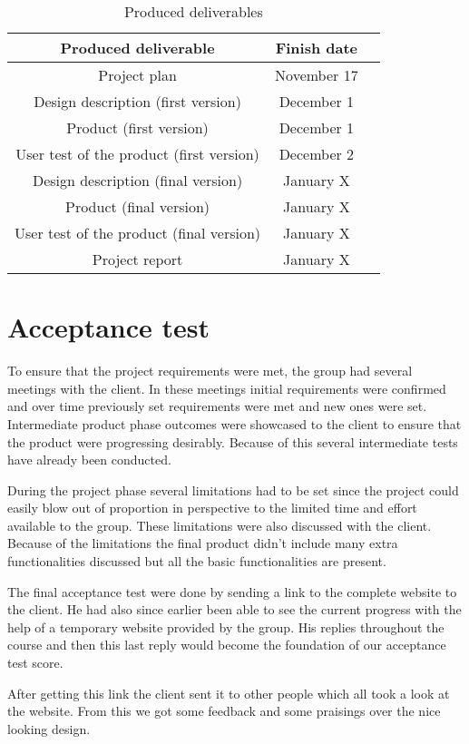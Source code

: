 \documentclass[]{article}
\begin{document}
\begin{table}[h!]
	\centering
	\label{tab:table1}
	\begin{tabular}{ccc}
		\toprule
		Produced deliverable & Finish date\\
		\midrule
		Project plan & November 17 \\
		Design description (first version) & December 1 \\
		Product (first version) & December 1 \\
		User test of the product (first version) & December 2 \\
		Design description (final version) & January X \\
		Product (final version) & January X \\
		User test of the product (final version) & January X \\
		Project report & January X \\
		\bottomrule
	\end{tabular}
	\caption{Produced deliverables}
\end{table}

\section{Acceptance test}
To ensure that the project requirements were met, the group had several meetings with the client. In these meetings initial requirements were confirmed and over time previously set requirements were met and new ones were set. Intermediate product phase outcomes were showcased to the client to ensure that the product were progressing desirably. Because of this several intermediate tests have already been conducted.

During the project phase several limitations had to be set since the project could easily blow out of proportion in perspective to the limited time and effort available to the group. These limitations were also discussed with the client. Because of the limitations the final product didn’t include many extra functionalities discussed but all the basic functionalities are present.

The final acceptance test were done by sending a link to the complete website to the client. He had also since earlier been able to see the current progress with the help of a temporary website provided by the group. His replies throughout the course and then this last reply would become the foundation of our acceptance test score.

After getting this link the client sent it to other people which all took a look at the website. From this we got some feedback and some praisings over the nice looking design.
\end{document}
